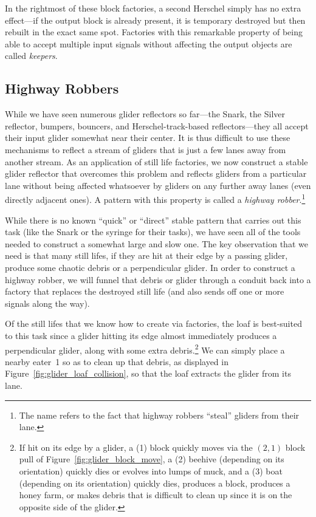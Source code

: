 In the rightmost of these block factories, a second Herschel simply has no extra effect---if the output block is already present, it is temporary destroyed but then rebuilt in the exact same spot. Factories with this remarkable property of being able to accept multiple input signals without affecting the output objects are called \emph{keepers}.


\subsection{Highway Robbers}\label{sec:highway_robber}

While we have seen numerous glider reflectors so far---the Snark, the Silver reflector, bumpers, bouncers, and Herschel-track-based reflectors---they all accept their input glider somewhat near their center. It is thus difficult to use these mechanisms to reflect a stream of gliders that is just a few lanes away from another stream. As an application of still life factories, we now construct a stable glider reflector that overcomes this problem and reflects gliders from a particular lane without being affected whatsoever by gliders on any further away lanes (even directly adjacent ones). A pattern with this property is called a \emph{highway robber}.\footnote{The name refers to the fact that highway robbers ``steal'' gliders from their lane.}

While there is no known ``quick'' or ``direct'' stable pattern that carries out this task (like the Snark or the syringe for their tasks), we have seen all of the tools needed to construct a somewhat large and slow one. The key observation that we need is that many still lifes, if they are hit at their edge by a passing glider, produce some chaotic debris or a perpendicular glider. In order to construct a highway robber, we will funnel that debris or glider through a conduit back into a factory that replaces the destroyed still life (and also sends off one or more signals along the way).

Of the still lifes that we know how to create via factories, the loaf is best-suited to this task since a glider hitting its edge almost immediately produces a perpendicular glider, along with some extra debris.\footnote{If hit on its edge by a glider, a (1) block quickly moves via the $(2,1)$ block pull of Figure~\ref{fig:glider_block_move}, a (2) beehive (depending on its orientation) quickly dies or evolves into lumps of muck, and a (3) boat (depending on its orientation) quickly dies, produces a block, produces a honey farm, or makes debris that is difficult to clean up since it is on the opposite side of the glider.} We can simply place a nearby eater~1 so as to clean up that debris, as displayed in Figure~\ref{fig:glider_loaf_collision}, so that the loaf extracts the glider from its lane.


